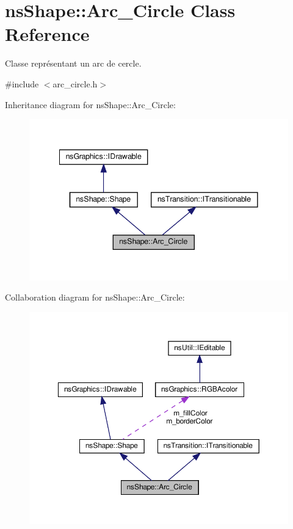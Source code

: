 \hypertarget{classns_shape_1_1_arc___circle}{}\section{ns\+Shape\+:\+:Arc\+\_\+\+Circle Class Reference}
\label{classns_shape_1_1_arc___circle}


Classe représentant un arc de cercle.  




{\ttfamily \#include $<$arc\+\_\+circle.\+h$>$}



Inheritance diagram for ns\+Shape\+:\+:Arc\+\_\+\+Circle\+:
\nopagebreak
\begin{figure}[H]
\begin{center}
\leavevmode
\includegraphics[width=341pt]{classns_shape_1_1_arc___circle__inherit__graph}
\end{center}
\end{figure}


Collaboration diagram for ns\+Shape\+:\+:Arc\+\_\+\+Circle\+:
\nopagebreak
\begin{figure}[H]
\begin{center}
\leavevmode
\includegraphics[width=350pt]{classns_shape_1_1_arc___circle__coll__graph}
\end{center}
\end{figure}
